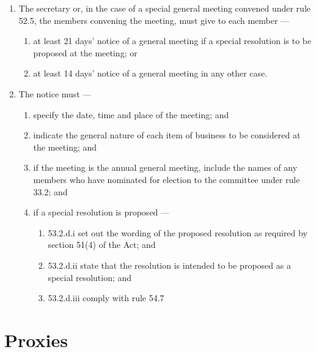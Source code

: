 \begin{enumerate}

\item The secretary or, in the case of a special general meeting convened under rule 52.5, the members convening the meeting, must give to each member ---

  \begin{enumerate}
  
  \item at least 21 days' notice of a general meeting if a special resolution is to be proposed at the meeting; or
  \item at least 14 days' notice of a general meeting in any other case.
  \end{enumerate}
\item The notice must ---

  \begin{enumerate}
  
  \item specify the date, time and place of the meeting; and
  \item indicate the general nature of each item of business to be considered at the meeting; and
  \item if the meeting is the annual general meeting, include the names of any members who have nominated for election to the committee under rule 33.2; and
  \item if a special resolution is proposed ---

    \begin{enumerate}
    
    \item 53.2.d.i set out the wording of the proposed resolution as required by section 51(4) of the Act; and
    \item 53.2.d.ii state that the resolution is intended to be proposed as a special resolution; and
    \item 53.2.d.iii comply with rule 54.7
    \end{enumerate}
  \end{enumerate}
\end{enumerate}

\hypertarget{proxies}{%
\section{Proxies}\label{proxies}}

